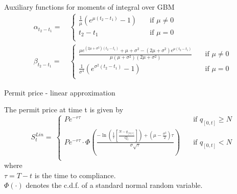 Auxiliary functions for moments of integral over GBM
\begin{align}
\alpha_{t_2-t_1}    =& \ \left\{
         \begin{array}{ll}
            \frac{1}{\mu} \left( e^{\mu \left( t_2 - t_1 \right)} - 1 \right)
            & \quad \mbox{if $\mu \ne 0$} \\
            t_2 - t_1
            & \quad \mbox{if $\mu = 0$} \\
         \end{array} \right. \label{MomIntAlpha} \\
\beta_{t_2-t_1}    =& \ \left\{
         \begin{array}{ll}
            \frac{ \mu e^{(2 \mu + \sigma^2) \left( t_2 - t_1 \right)} + \mu + \sigma^2 - \left( 2\mu + \sigma^2\right) e^{\mu \left( t_2 - t_1 \right)}}{\mu(\mu + \sigma^2)(2\mu + \sigma^2)}
            & \quad \mbox{if $\mu \ne 0$} \\
            \frac{1}{\sigma^4} \left( e^{\sigma^2\left(t_2-t_1\right)} - 1\right)
            & \quad \mbox{if $\mu = 0$} \\
         \end{array} \right. \label{MomIntBeta}
\end{align}


Permit price - linear approximation
\begin{block}{}
The permit price at time t is given by
  $$
  S_t^{Lin} = \ \left\{
         \begin{array}{ll}
            P e^{-r\tau}
            & \quad \mbox{if $q_{[0,t]} \ge N$} \\
            P e^{-r\tau} \cdot \Phi \left(\frac{-\ln\left( \frac{1}{\tau} \left[ \frac{N - q_{[0,t]}}{Q_t} \right] \right) + \left( \mu - \frac{\sigma^2}{2}\right)\tau}{\sigma \sqrt{\tau}} \right) & \quad 						\mbox{if $q_{[0,t]} < N$} \\
         \end{array} \right.
	$$
	where \\
	$\tau = T - t$ is the time to compliance. \\
	$\Phi(\cdot)$ denotes the c.d.f. of a standard normal random variable.
\end{block}



